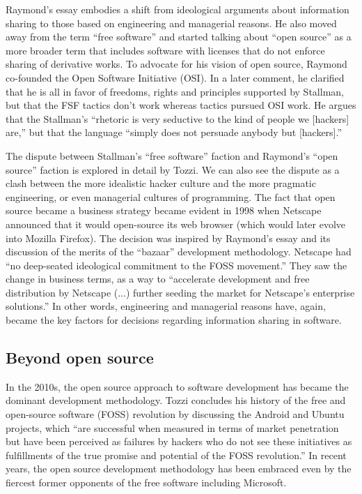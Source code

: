 Raymond's essay embodies a shift from ideological arguments about information sharing
to those based on engineering and managerial reasons. He also moved away from
the term ``free software'' and started talking about ``open source'' as a more broader term
that includes software with licenses that do not enforce sharing of derivative works. To advocate
for his vision of open source, Raymond co-founded the Open Software Initiative (OSI). In a later
comment, he clarified that he is all in favor of freedoms,
rights and principles supported by Stallman, but that the FSF tactics don't work whereas tactics
pursued OSI work. He argues that the Stallman's ``rhetoric is very seductive to the kind of people
we [hackers] are,'' but that the language ``simply does not persuade anybody but [hackers].''

The dispute between Stallman's ``free software'' faction and Raymond's ``open source'' faction
is explored in detail by Tozzi. We can also see the dispute as a
clash between the more idealistic hacker culture and the more pragmatic engineering, or even
managerial cultures of programming. The fact that open source
became a business strategy became evident in 1998 when Netscape announced that it would
open-source its web browser (which would later evolve into Mozilla Firefox). The decision was
inspired by Raymond's essay and its discussion of the merits of the ``bazaar'' development
methodology. Netscape had ``no deep-seated ideological commitment to the FOSS
movement.'' They saw the change in business terms, as a way to
``accelerate development and free distribution by Netscape (...) further seeding the market for
Netscape's enterprise solutions.'' In other words, engineering and
managerial reasons have, again, became the key factors for decisions regarding information
sharing in software.

\subsection{Beyond open source}
In the 2010s, the open source approach to software development has became the dominant
development methodology. Tozzi concludes his history of the free and open-source
software (FOSS) revolution by discussing the Android and Ubuntu projects, which ``are successful
when measured in terms of market penetration but have been perceived as failures by hackers who
do not see these initiatives as fulfillments of the true promise and potential of the
FOSS revolution.'' In recent years, the open source development
methodology has been embraced even by the fiercest former opponents of the free software
including Microsoft.

